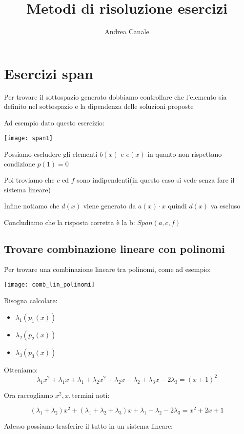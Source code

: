 \documentclass[a4paper]{article}
\title{Metodi di risoluzione esercizi}
\author{Andrea Canale}
\begin{document}
\maketitle
\tableofcontents

\section{Esercizi span}

Per trovare il sottospazio generato dobbiamo controllare che l'elemento sia definito nel sottospazio e  la dipendenza delle soluzioni proposte

Ad esempio dato questo esercizio: 

\texttt{[image: span1]}

Possiamo escludere gli elementi $b(x) $ e $ e(x) $ in quanto non rispettano condizione $p(1) = 0$

Poi troviamo che $c$ ed $f$ sono indipendenti(in questo caso si vede senza fare il sistema lineare)

Infine notiamo che $d(x) $ viene generato da $a(x) \cdot x$ quindi $d(x)$ va escluso

Concludiamo che la risposta corretta è la b: $Span(a,c,f)$

\subsection{Trovare combinazione lineare con polinomi}

Per trovare una combinazione lineare tra polinomi, come ad esempio: 

\texttt{[image: comb\_lin\_polinomi]}

Bisogna calcolare:

\begin{itemize}
	\item $\lambda_1(p_1(x))$
	\item $\lambda_2(p_2(x))$
	\item $\lambda_3(p_3(x))$
\end{itemize}

Otteniamo: $$ \lambda_1 x^2 + \lambda_1 x + \lambda_1 + \lambda_2 x^2 + \lambda_2 x - \lambda_2 + \lambda_3 x - 2\lambda_3 = (x+1)^2 $$

Ora raccogliamo $x^2, x, \text{termini noti} $:

$$(\lambda_1 + \lambda_2) x^2 + (\lambda_1 + \lambda_2 + \lambda_3)x + \lambda_1 - \lambda_2 - 2\lambda_3 = x^2 + 2x + 1$$

Adesso possiamo trasferire il tutto in un sistema lineare:
\end{document}

